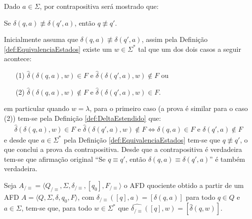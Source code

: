 \begin{prova}
	Dado $a \in \Sigma$, por contrapositiva será mostrado que: 
	\begin{center}
		Se $\delta(q, a) \not\equiv \delta(q', a)$, então $q \not\equiv q'$. 
	\end{center}
	Inicialmente assuma que $\delta(q, a) \not\equiv \delta(q', a)$, assim pela Definição \ref{def:EquivalenciaEstados} existe um $w \in \Sigma^*$ tal que um dos dois casos a seguir acontece:
	\begin{itemize}
		\item[(1)] $\widehat{\delta}(\delta(q, a), w)  \in F$ e $\widehat{\delta}(\delta(q', a), w)  \notin F$ ou
		\item[(2)] $\widehat{\delta}(\delta(q, a), w)  \notin F$ e $\widehat{\delta}(\delta(q', a), w)  \in F$.
	\end{itemize}
	em particular quando $w = \lambda$, para o primeiro caso (a prova é similar para o caso (2)) tem-se pela Definição \ref{def:DeltaEstendido} que:
	\begin{eqnarray*}
		\widehat{\delta}(\delta(q, a), w)  \in F \text{ e } \widehat{\delta}(\delta(q', a), w)  \notin F \Longleftrightarrow \delta(q, a)  \in F \text{ e }\delta(q', a)  \notin F
	\end{eqnarray*}
	e desde que $a \in \Sigma^*$ pela Definição \ref{def:EquivalenciaEstados} tem-se que $q \not\equiv q'$, o que conclui a prova da contrapositiva. Desde que a contrapositiva é verdadeira tem-se que afirmação original ``Se $q \equiv q'$, então $\delta(q, a) \equiv \delta(q', a)$'' é também verdadeira.
\end{prova}

\begin{teorema}\label{teo:ExtensaoDeltaEstrela}
	Seja  $A_{/\equiv} = \langle Q_{/\equiv}, \Sigma, \delta_{/\equiv}, [q_0],  F_{/\equiv}\rangle$ o AFD quociente obtido a partir de um AFD $A = \langle Q, \Sigma, \delta, q_0, F\rangle$, com $\delta_{/\equiv}([q], a) = [\delta(q, a)]$ para todo $q \in Q$ e $a \in \Sigma$, tem-se que, para todo $w \in \Sigma^*$ que $\widehat{\delta_{/\equiv}}([q], w) = [\widehat{\delta}(q, w)]$.
\end{teorema}

